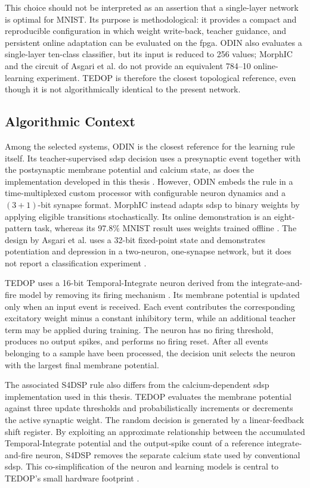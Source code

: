 This choice should not be interpreted as an assertion that a single-layer network is optimal for MNIST. Its purpose is methodological: it provides a compact and reproducible configuration in which weight write-back, teacher guidance, and persistent online adaptation can be evaluated on the \gls{fpga}. ODIN also evaluates a single-layer ten-class classifier, but its input is reduced to 256 values; MorphIC and the circuit of Asgari et al. do not provide an equivalent 784--10 online-learning experiment. TEDOP is therefore the closest topological reference, even though it is not algorithmically identical to the present network.

\subsection{Algorithmic Context}

Among the selected systems, ODIN is the closest reference for the learning rule itself. Its teacher-supervised \gls{sdsp} decision uses a presynaptic event together with the postsynaptic membrane potential and calcium state, as does the implementation developed in this thesis \cite{Frenkel2019ODIN}. However, ODIN embeds the rule in a time-multiplexed custom processor with configurable neuron dynamics and a $(3+1)$-bit synapse format. MorphIC instead adapts \gls{sdsp} to binary weights by applying eligible transitions stochastically. Its online demonstration is an eight-pattern task, whereas its 97.8\% MNIST result uses weights trained offline \cite{Frenkel2019MorphIC}. The design by Asgari et al. uses a 32-bit fixed-point state and demonstrates potentiation and depression in a two-neuron, one-synapse network, but it does not report a classification experiment \cite{Asgari2020SDSP}.

TEDOP uses a 16-bit Temporal-Integrate neuron derived from the integrate-and-fire model by removing its firing mechanism \cite{Shi2022TEDOP}. Its membrane potential is updated only when an input event is received. Each event contributes the corresponding excitatory weight minus a constant inhibitory term, while an additional teacher term may be applied during training. The neuron has no firing threshold, produces no output spikes, and performs no firing reset. After all events belonging to a sample have been processed, the decision unit selects the neuron with the largest final membrane potential.

The associated S4DSP rule also differs from the calcium-dependent \gls{sdsp} implementation used in this thesis. TEDOP evaluates the membrane potential against three update thresholds and probabilistically increments or decrements the active synaptic weight. The random decision is generated by a linear-feedback shift register. By exploiting an approximate relationship between the accumulated Temporal-Integrate potential and the output-spike count of a reference integrate-and-fire neuron, S4DSP removes the separate calcium state used by conventional \gls{sdsp}. This co-simplification of the neuron and learning models is central to TEDOP's small hardware footprint \cite{Shi2022TEDOP}.

